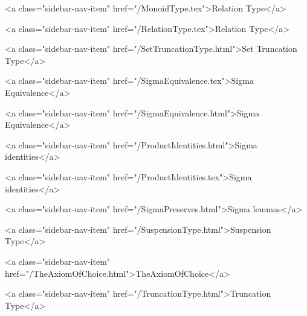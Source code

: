       
        
          <a class="sidebar-nav-item" href="/MonoidType.tex">Relation Type</a>
        
      
    
      
        
          <a class="sidebar-nav-item" href="/RelationType.tex">Relation Type</a>
        
      
    
      
        
          <a class="sidebar-nav-item" href="/SetTruncationType.html">Set Truncation Type</a>
        
      
    
      
        
          <a class="sidebar-nav-item" href="/SigmaEquivalence.tex">Sigma Equivalence</a>
        
      
    
      
        
          <a class="sidebar-nav-item" href="/SigmaEquivalence.html">Sigma Equivalence</a>
        
      
    
      
        
          <a class="sidebar-nav-item" href="/ProductIdentities.html">Sigma identities</a>
        
      
    
      
        
          <a class="sidebar-nav-item" href="/ProductIdentities.tex">Sigma identities</a>
        
      
    
      
        
          <a class="sidebar-nav-item" href="/SigmaPreserves.html">Sigma lemmas</a>
        
      
    
      
        
          <a class="sidebar-nav-item" href="/SuspensionType.html">Suspension Type</a>
        
      
    
      
        
          <a class="sidebar-nav-item" href="/TheAxiomOfChoice.html">TheAxiomOfChoice</a>
        
      
    
      
        
          <a class="sidebar-nav-item" href="/TruncationType.html">Truncation Type</a>
        
